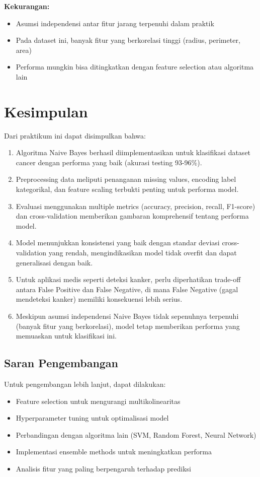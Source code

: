 \documentclass[12pt,a4paper]{article}
\begin{document}
\textbf{Kekurangan:}
\begin{itemize}
    \item Asumsi independensi antar fitur jarang terpenuhi dalam praktik
    \item Pada dataset ini, banyak fitur yang berkorelasi tinggi (radius, perimeter, area)
    \item Performa mungkin bisa ditingkatkan dengan feature selection atau algoritma lain
\end{itemize}

\newpage
\section{Kesimpulan}

Dari praktikum ini dapat disimpulkan bahwa:

\begin{enumerate}
    \item Algoritma Naive Bayes berhasil diimplementasikan untuk klasifikasi dataset cancer dengan performa yang baik (akurasi testing 93-96\%).
    
    \item Preprocessing data meliputi penanganan missing values, encoding label kategorikal, dan feature scaling terbukti penting untuk performa model.
    
    \item Evaluasi menggunakan multiple metrics (accuracy, precision, recall, F1-score) dan cross-validation memberikan gambaran komprehensif tentang performa model.
    
    \item Model menunjukkan konsistensi yang baik dengan standar deviasi cross-validation yang rendah, mengindikasikan model tidak overfit dan dapat generalisasi dengan baik.
    
    \item Untuk aplikasi medis seperti deteksi kanker, perlu diperhatikan trade-off antara False Positive dan False Negative, di mana False Negative (gagal mendeteksi kanker) memiliki konsekuensi lebih serius.
    
    \item Meskipun asumsi independensi Naive Bayes tidak sepenuhnya terpenuhi (banyak fitur yang berkorelasi), model tetap memberikan performa yang memuaskan untuk klasifikasi ini.
\end{enumerate}

\subsection{Saran Pengembangan}
Untuk pengembangan lebih lanjut, dapat dilakukan:
\begin{itemize}
    \item Feature selection untuk mengurangi multikolinearitas
    \item Hyperparameter tuning untuk optimalisasi model
    \item Perbandingan dengan algoritma lain (SVM, Random Forest, Neural Network)
    \item Implementasi ensemble methods untuk meningkatkan performa
    \item Analisis fitur yang paling berpengaruh terhadap prediksi
\end{itemize}
\end{document}
